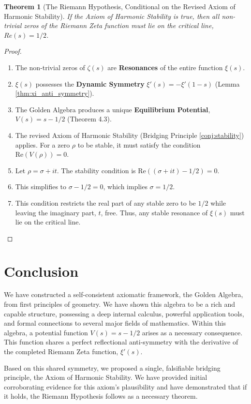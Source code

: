 \documentclass{article}
\theoremstyle{plain}
\newtheorem{theorem}{Theorem}[section]
\theoremstyle{definition}
\theoremstyle{remark}
\begin{document}
\begin{theorem}[The Riemann Hypothesis, Conditional on the Revised Axiom of Harmonic Stability]
If the Axiom of Harmonic Stability is true, then all non-trivial zeros of the Riemann Zeta function must lie on the critical line, $Re(s)=1/2$.
\end{theorem}
\begin{proof}
\begin{enumerate}
    \item The non-trivial zeros of $\zeta(s)$ are \textbf{Resonances} of the entire function $\xi(s)$.
    \item $\xi(s)$ possesses the \textbf{Dynamic Symmetry} $\xi'(s) = -\xi'(1-s)$ (Lemma \ref{thm:xi_anti_symmetry}).
    \item The Golden Algebra produces a unique \textbf{Equilibrium Potential}, $V(s) = s - 1/2$ (Theorem 4.3).
    \item The revised Axiom of Harmonic Stability (Bridging Principle \ref{conj:stability}) applies. For a zero $\rho$ to be stable, it must satisfy the condition $\text{Re}(V(\rho))=0$.
    \item Let $\rho = \sigma + it$. The stability condition is $\text{Re}((\sigma + it) - 1/2) = 0$.
    \item This simplifies to $\sigma - 1/2 = 0$, which implies $\sigma = 1/2$.
    \item This condition restricts the real part of any stable zero to be $1/2$ while leaving the imaginary part, $t$, free. Thus, any stable resonance of $\xi(s)$ must lie on the critical line.
\end{enumerate}
\end{proof}

\section{Conclusion}
We have constructed a self-consistent axiomatic framework, the Golden Algebra, from first principles of geometry. We have shown this algebra to be a rich and capable structure, possessing a deep internal calculus, powerful application tools, and formal connections to several major fields of mathematics. Within this algebra, a potential function $V(s) = s - 1/2$ arises as a necessary consequence. This function shares a perfect reflectional anti-symmetry with the derivative of the completed Riemann Zeta function, $\xi'(s)$.

Based on this shared symmetry, we proposed a single, falsifiable bridging principle, the Axiom of Harmonic Stability. We have provided initial corroborating evidence for this axiom's plausibility and have demonstrated that if it holds, the Riemann Hypothesis follows as a necessary theorem.
\end{document}
